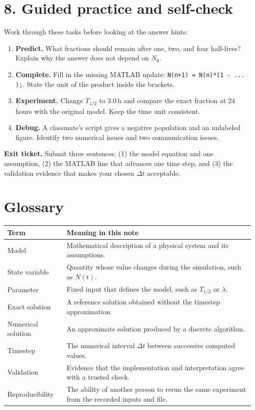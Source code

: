 \documentclass[11pt,a4paper]{article}
\begin{document}
\section*{8. Guided practice and self-check}
Work through these tasks before looking at the answer hints:
\begin{enumerate}[nosep,leftmargin=6mm]
  \item \textbf{Predict.} What fractions should remain after one, two, and four half-lives? Explain why the answer does not depend on $N_0$.
  \item \textbf{Complete.} Fill in the missing MATLAB update: \texttt{N(n+1) = N(n)*(1 - ... );}. State the unit of the product inside the brackets.
  \item \textbf{Experiment.} Change $T_{1/2}$ to $3.0\,\mathrm{h}$ and compare the exact fraction at 24 hours with the original model. Keep the time unit consistent.
  \item \textbf{Debug.} A classmate's script gives a negative population and an unlabeled figure. Identify two numerical issues and two communication issues.
\end{enumerate}

\begin{checkbox}
\textbf{Exit ticket.} Submit three sentences: (1) the model equation and one assumption, (2) the MATLAB line that advances one time step, and (3) the validation evidence that makes your chosen $\Delta t$ acceptable.
\end{checkbox}

\section*{Glossary}
\begin{center}
\small
\begin{tabular}{>{\raggedright\arraybackslash}p{.24\linewidth}p{.63\linewidth}}
\toprule
\textbf{Term} & \textbf{Meaning in this note}\\ \midrule
Model & Mathematical description of a physical system and its assumptions.\\
State variable & Quantity whose value changes during the simulation, such as $N(t)$.\\
Parameter & Fixed input that defines the model, such as $T_{1/2}$ or $\lambda$.\\
Exact solution & A reference solution obtained without the timestep approximation.\\
Numerical solution & An approximate solution produced by a discrete algorithm.\\
Timestep & The numerical interval $\Delta t$ between successive computed values.\\
Validation & Evidence that the implementation and interpretation agree with a trusted check.\\
Reproducibility & The ability of another person to rerun the same experiment from the recorded inputs and file.\\ \bottomrule
\end{tabular}
\end{center}
\end{document}

